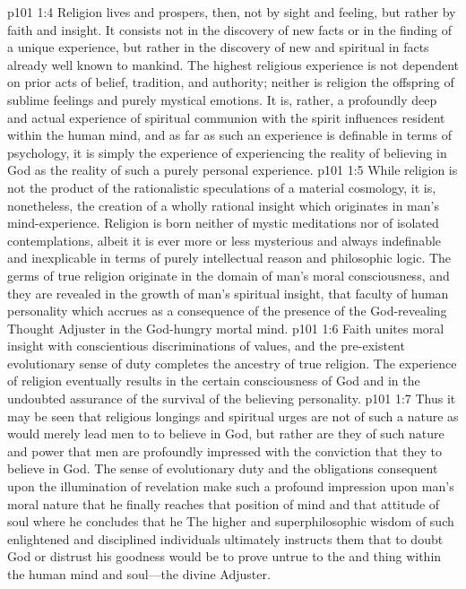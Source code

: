 \vs p101 1:4 Religion lives and prospers, then, not by sight and feeling, but rather by faith and insight. It consists not in the discovery of new facts or in the finding of a unique experience, but rather in the discovery of new and spiritual  in facts already well known to mankind. The highest religious experience is not dependent on prior acts of belief, tradition, and authority; neither is religion the offspring of sublime feelings and purely mystical emotions. It is, rather, a profoundly deep and actual experience of spiritual communion with the spirit influences resident within the human mind, and as far as such an experience is definable in terms of psychology, it is simply the experience of experiencing the reality of believing in God as the reality of such a purely personal experience.\plusone
\pc \vs p101 1:5 While religion is not the product of the rationalistic speculations of a material cosmology, it is, nonetheless, the creation of a wholly rational insight which originates in man’s mind\hyp{}experience. Religion is born neither of mystic meditations nor of isolated contemplations, albeit it is ever more or less mysterious and always indefinable and inexplicable in terms of purely intellectual reason and philosophic logic. The germs of true religion originate in the domain of man’s moral consciousness, and they are revealed in the growth of man’s spiritual insight, that faculty of human personality which accrues as a consequence of the presence of the God\hyp{}revealing Thought Adjuster in the God\hyp{}hungry mortal mind.
\vs p101 1:6 Faith unites moral insight with conscientious discriminations of values, and the pre\hyp{}existent evolutionary sense of duty completes the ancestry of true religion. The experience of religion eventually results in the certain consciousness of God and in the undoubted assurance of the survival of the believing personality.
\vs p101 1:7 Thus it may be seen that religious longings and spiritual urges are not of such a nature as would merely lead men to  to believe in God, but rather are they of such nature and power that men are profoundly impressed with the conviction that they  to believe in God. The sense of evolutionary duty and the obligations consequent upon the illumination of revelation make such a profound impression upon man’s moral nature that he finally reaches that position of mind and that attitude of soul where he concludes that he  The higher and superphilosophic wisdom of such enlightened and disciplined individuals ultimately instructs them that to doubt God or distrust his goodness would be to prove untrue to the  and  thing within the human mind and soul---the divine Adjuster.
